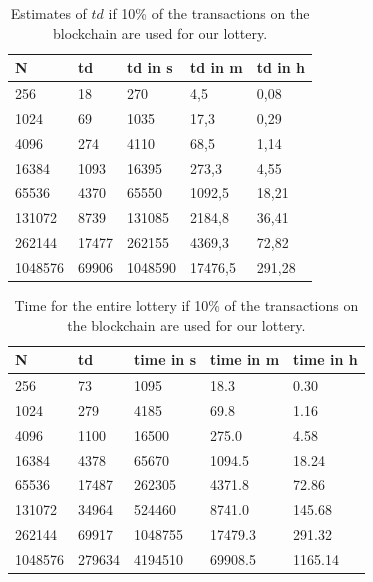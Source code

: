 \begin{table}[h]
\centering
\caption{Estimates of $td$ if 10\% of the transactions on the blockchain are used for our lottery.}
\label{tab:td-10percent-transactions}
\begin{tabular}{|l|l|l|l|l|}
\hline

N & td & td in s & td in m & td in h \\ \hline
256 & 18 & 270 & 4,5 & 0,08 \\ \hline
1024 & 69 & 1035 & 17,3 & 0,29 \\ \hline
4096 & 274 & 4110 & 68,5 & 1,14 \\ \hline
16384 & 1093 & 16395 & 273,3 & 4,55 \\ \hline
65536 & 4370 & 65550 & 1092,5 & 18,21 \\ \hline
131072 & 8739 & 131085 & 2184,8 & 36,41 \\ \hline
262144 & 17477 & 262155 & 4369,3 & 72,82 \\ \hline
1048576 & 69906 & 1048590 & 17476,5 & 291,28 \\ \hline

\end{tabular}
\end{table}

\begin{table}[h]
\centering
\caption{Time for the entire lottery if 10\% of the transactions on the blockchain are used for our lottery.}
\label{tab:total-time-10percent-transactions}
\begin{tabular}{|l|l|l|l|l|}
\hline

N & td & time in s & time in m & time in h \\ \hline
256 & 73 & 1095 & 18.3 & 0.30 \\ \hline
1024 & 279 & 4185 & 69.8 & 1.16 \\ \hline
4096 & 1100 & 16500 & 275.0 & 4.58 \\ \hline
16384 & 4378 & 65670 & 1094.5 & 18.24 \\ \hline
65536 & 17487 & 262305 & 4371.8 & 72.86 \\ \hline
131072 & 34964 & 524460 & 8741.0 & 145.68 \\ \hline
262144 & 69917 & 1048755 & 17479.3 & 291.32 \\ \hline
1048576 & 279634 & 4194510 & 69908.5 & 1165.14 \\ \hline

\end{tabular}
\end{table}

